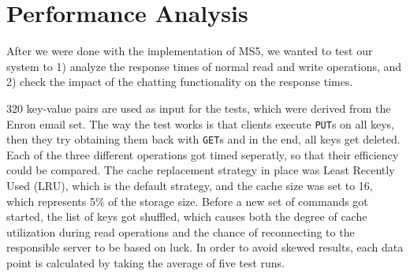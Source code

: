 \section{Performance Analysis}
\label{sec:perf}


After we were done with the implementation of MS5, we wanted to test our system to 1) analyze the response times of normal read and write operations, and 2) check the impact of the chatting functionality on the response times. %

320 key-value pairs are used as input for the tests, which were derived from the Enron email set. The way the test works is that clients execute \texttt{PUT}s on all keys, then they try obtaining them back with \texttt{GET}s and in the end, all keys get deleted. Each of the three different operations got timed seperatly, so that their efficiency could be compared. The cache replacement strategy in place was Least Recently Used (LRU), which is the default strategy, and the cache size was set to 16, which represents 5\% of the storage size. Before a new set of commands got started, the list of keys got shuffled, which causes both the degree of cache utilization during read operations and the chance of reconnecting to the responsible server to be based on luck.
In order to avoid skewed results, each data point is calculated by taking the average of five test runs. %

